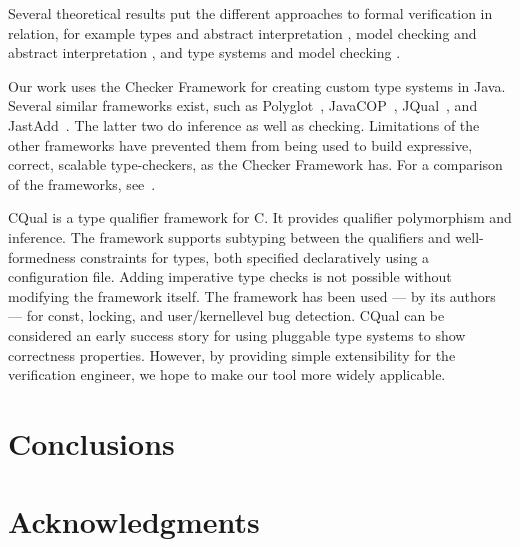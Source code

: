 \documentclass{sig-alternate}
\begin{document}
Several theoretical results put the different approaches to formal
verification in relation, for example
types and abstract interpretation
\cite{Cousot1997},
model checking and abstract interpretation
\cite{CousotCousot2000},
and type systems and model checking
\cite{NaikPalsberg2005}.




Our work uses the Checker Framework for creating custom type systems in
Java.  Several similar frameworks exist, such as
Polyglot~\cite{NystromCM2003},
JavaCOP~\cite{MarkstrumMEMAN2010,AndreaeNMM2006},
JQual~\cite{GreenfieldboyceF2007}, and
JastAdd~\cite{EkmanH2007:JastAdd}.
The latter two do inference as well as checking.
Limitations of the other frameworks have prevented them from being used to
build expressive, correct, scalable type-checkers, as the Checker Framework has.
For a comparison of the frameworks, see~\cite{PapiACPE2008}.

CQual \cite{FosterFFA99,foster:pldi02}
is a type qualifier framework for C.
It provides qualifier polymorphism and inference.
The framework supports subtyping between the qualifiers and
well-formedness constraints for types, both specified declaratively
using a configuration file. Adding imperative type checks is not
possible without modifying the framework itself.
The framework has been used --- by its authors --- for const, locking, and
user/ker\-nel\discretionary{-}{}{}level bug detection.
CQual can be considered an early success story for using pluggable
type systems to show correctness properties.
However, by providing simple extensibility for the verification
engineer, we hope to make our tool more widely applicable.



\section{Conclusions}


\section{Acknowledgments}


\cite{checker-framework-website}






\balancecolumns
\end{document}
